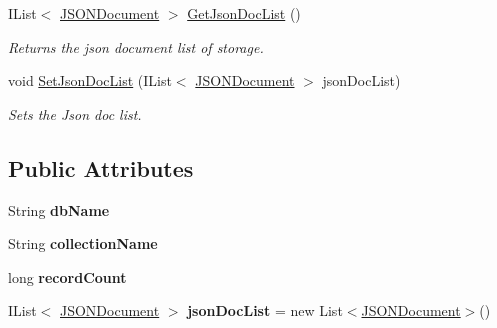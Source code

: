 \begin{DoxyCompactItemize}
I\+List$<$ \hyperlink{classcom_1_1shephertz_1_1app42_1_1paas_1_1sdk_1_1csharp_1_1storage_1_1_storage_1_1_j_s_o_n_document}{J\+S\+O\+N\+Document} $>$ \hyperlink{classcom_1_1shephertz_1_1app42_1_1paas_1_1sdk_1_1csharp_1_1storage_1_1_storage_ad538bda783ccf513d7bc4a5417cb81bc}{Get\+Json\+Doc\+List} ()
\begin{DoxyCompactList}\small\item\em Returns the json document list of storage. \end{DoxyCompactList}\item 
void \hyperlink{classcom_1_1shephertz_1_1app42_1_1paas_1_1sdk_1_1csharp_1_1storage_1_1_storage_a3af7d8e17208468eccd38d0bb3a32622}{Set\+Json\+Doc\+List} (I\+List$<$ \hyperlink{classcom_1_1shephertz_1_1app42_1_1paas_1_1sdk_1_1csharp_1_1storage_1_1_storage_1_1_j_s_o_n_document}{J\+S\+O\+N\+Document} $>$ json\+Doc\+List)
\begin{DoxyCompactList}\small\item\em Sets the Json doc list. \end{DoxyCompactList}\end{DoxyCompactItemize}
\subsection*{Public Attributes}
\begin{DoxyCompactItemize}
\item 
\hypertarget{classcom_1_1shephertz_1_1app42_1_1paas_1_1sdk_1_1csharp_1_1storage_1_1_storage_a55a3b941e53c1a16eac1735e174edd49}{String {\bfseries db\+Name}}\label{classcom_1_1shephertz_1_1app42_1_1paas_1_1sdk_1_1csharp_1_1storage_1_1_storage_a55a3b941e53c1a16eac1735e174edd49}

\item 
\hypertarget{classcom_1_1shephertz_1_1app42_1_1paas_1_1sdk_1_1csharp_1_1storage_1_1_storage_a553e21d6b414a9cacf52321483b8c89a}{String {\bfseries collection\+Name}}\label{classcom_1_1shephertz_1_1app42_1_1paas_1_1sdk_1_1csharp_1_1storage_1_1_storage_a553e21d6b414a9cacf52321483b8c89a}

\item 
\hypertarget{classcom_1_1shephertz_1_1app42_1_1paas_1_1sdk_1_1csharp_1_1storage_1_1_storage_a6830007a7adefe8c18ecc8c8318aa463}{long {\bfseries record\+Count}}\label{classcom_1_1shephertz_1_1app42_1_1paas_1_1sdk_1_1csharp_1_1storage_1_1_storage_a6830007a7adefe8c18ecc8c8318aa463}

\item 
\hypertarget{classcom_1_1shephertz_1_1app42_1_1paas_1_1sdk_1_1csharp_1_1storage_1_1_storage_a334b92a01d942f2c1a940cc63eb0caeb}{I\+List$<$ \hyperlink{classcom_1_1shephertz_1_1app42_1_1paas_1_1sdk_1_1csharp_1_1storage_1_1_storage_1_1_j_s_o_n_document}{J\+S\+O\+N\+Document} $>$ {\bfseries json\+Doc\+List} = new List$<$\hyperlink{classcom_1_1shephertz_1_1app42_1_1paas_1_1sdk_1_1csharp_1_1storage_1_1_storage_1_1_j_s_o_n_document}{J\+S\+O\+N\+Document}$>$()}\label{classcom_1_1shephertz_1_1app42_1_1paas_1_1sdk_1_1csharp_1_1storage_1_1_storage_a334b92a01d942f2c1a940cc63eb0caeb}

\end{DoxyCompactItemize}


